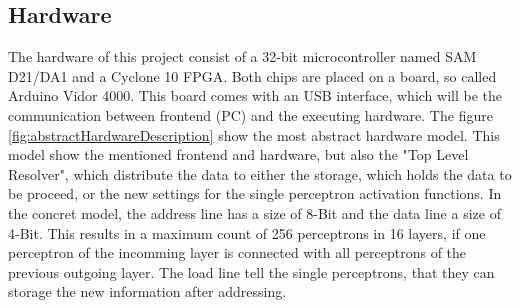 \documentclass{report}
\numberwithin{equation}{section}
\begin{document}
\subsection{Hardware}
The hardware of this project consist of a 32-bit microcontroller named SAM D21/DA1 and a
Cyclone 10 FPGA. Both chips are placed on a board, so called Arduino Vidor 4000. This board
comes with an USB interface, which will be the communication between frontend (PC) and
the executing hardware. The figure \ref{fig:abstractHardwareDescription} show the most
abstract hardware model. This model show the mentioned frontend and hardware, but also the
"Top Level Resolver", which distribute the data to either the storage, which holds the data to
be proceed, or the new settings for the single perceptron activation functions. In the concret
model, the address line has a size of 8-Bit and the data line a size of 4-Bit. This results
in a maximum count of 256 perceptrons in 16 layers, if one perceptron of the incomming layer
is connected with all perceptrons of the previous outgoing layer. The load line tell the single
perceptrons, that they can storage the new information after addressing.
\end{document}
